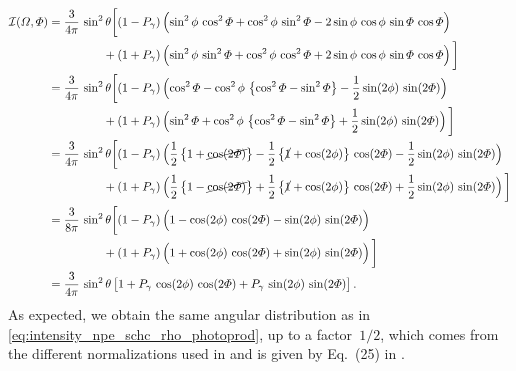\begin{align*}
  \intensity(\Omega, \Phi)
  ={}& \begin{aligned}[t] \frac{3}{4 \pi}\, \sin^2 \theta \bigg[
         &(1 - P_\gamma) \rBrk[2]{\sin^2 \phi\, \cos^2 \Phi + \cos^2 \phi\, \sin^2 \Phi - 2 \sin \phi\, \cos \phi\, \sin \Phi\, \cos \Phi}
    \\
    {}+{}&(1 + P_\gamma) \rBrk[2]{\sin^2 \phi\, \sin^2 \Phi + \cos^2 \phi\, \cos^2 \Phi + 2 \sin \phi\, \cos \phi\, \sin \Phi\, \cos \Phi}
    \bigg]
  \end{aligned}
  \\
  ={}& \begin{aligned}[t] \frac{3}{4 \pi}\, \sin^2 \theta \bigg[
         &(1 - P_\gamma) \rBrk[2]{\cos^2 \Phi - \cos^2 \phi\, \cBrk[1]{\cos^2 \Phi - \sin^2 \Phi} - \frac{1}{2} \sin(2 \phi)\, \sin(2 \Phi)}
    \\
    {}+{}&(1 + P_\gamma) \rBrk[2]{\sin^2 \Phi + \cos^2 \phi\, \cBrk[1]{\cos^2 \Phi - \sin^2 \Phi} + \frac{1}{2} \sin(2 \phi)\, \sin(2 \Phi)}
    \bigg]
  \end{aligned}
  \\
  ={}& \begin{aligned}[t] \frac{3}{4 \pi}\, \sin^2 \theta \bigg[
         &(1 - P_\gamma) \rBrk[2]{\frac{1}{2} \cBrk[1]{1 + \cancel{\cos(2 \Phi)}} - \frac{1}{2} \cBrk[1]{\cancel{1} + \cos(2 \phi)}\, \cos(2 \Phi) - \frac{1}{2} \sin(2 \phi)\, \sin(2 \Phi)}
    \\
    {}+{}&(1 + P_\gamma) \rBrk[2]{\frac{1}{2} \cBrk[1]{1 - \cancel{\cos(2 \Phi)}} + \frac{1}{2} \cBrk[1]{\cancel{1} + \cos(2 \phi)}\, \cos(2 \Phi) + \frac{1}{2} \sin(2 \phi)\, \sin(2 \Phi)}
    \bigg]
  \end{aligned}
  \\
  ={}& \begin{aligned}[t] \frac{3}{8 \pi}\, \sin^2 \theta \bigg[
         &(1 - P_\gamma) \rBrk[2]{1 - \cos(2 \phi)\, \cos(2 \Phi) - \sin(2 \phi)\, \sin(2 \Phi)}
    \\
    {}+{}&(1 + P_\gamma) \rBrk[2]{1 + \cos(2 \phi)\, \cos(2 \Phi) + \sin(2 \phi)\, \sin(2 \Phi)}
    \bigg]
  \end{aligned}
  \\
  ={}& \frac{3}{4 \pi}\, \sin^2 \theta \sBrk{1
  + P_\gamma\, \cos(2 \phi)\, \cos(2 \Phi)
  + P_\gamma\, \sin(2 \phi)\, \sin(2 \Phi)}.
\end{align*}
As expected, we obtain the same angular distribution as in
\cref{eq:intensity_npe_schc_rho_photoprod}, up to a factor~$1 / 2$,
which comes from the different normalizations used in
 and is given by Eq.~(25) in
.


